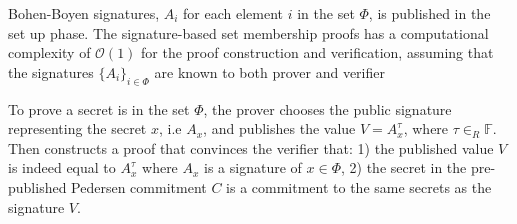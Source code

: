  Bohen-Boyen signatures, $A_i$ for each element  $i$ in the set $\Phi$, is published in the set up phase. The signature-based set membership proofs has a computational complexity of $\mathcal{O}(1)$ for the proof construction and verification, assuming that the signatures $\{A_i\}_{i\in\Phi}$ are known to both prover and verifier 

To prove a secret is in the set $\Phi$, the prover chooses the public signature  representing the secret $x$, i.e $A_x$, and publishes the value $V = A_x^\tau$, where $\tau\in_R\mathds{F}$.
Then constructs a proof that convinces the verifier that:  1) the published value $V$ is indeed equal to  $A_x^\tau$ where $A_x$ is a signature of $x\in\Phi$,  2) the secret in the pre-published Pedersen commitment $C$ is a commitment to the same secrets as the signature $V$.

